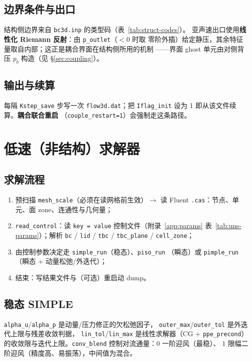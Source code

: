 \documentclass[11pt,a4paper]{ctexart}
\begin{document}
\subsection{边界条件与出口}

结构侧边界来自 \texttt{bc3d.inp} 的类型码（表~\ref{tab:struct-codes}）。
亚声速出口使用\textbf{线性化 Riemann 反射}：由 \texttt{p\_outlet}（$<0$ 时取
零阶外插）给定静压，其余特征量取自内部；这正是耦合界面在结构侧所用的机制
——界面 ghost 单元由对侧背压 $p_b$ 构造（见 \S\ref{sec:coupling}）。

\subsection{输出与续算}

每隔 \texttt{Kstep\_save} 步写一次 \texttt{flow3d.dat}；把
\texttt{Iflag\_init} 设为 1 即从该文件续算。\textbf{耦合联合重启}
（\texttt{couple\_restart=1}）会强制走这条路径。

\section{低速（非结构）求解器}\label{sec:uns}

\subsection{求解流程}

\begin{enumerate}\itemsep2pt
  \item 预扫描 \texttt{mesh\_scale}（必须在读网格前生效）$\to$ 读 Fluent
        \texttt{.cas}：节点、单元、面 zone、连通性与几何量；
  \item \texttt{read\_control}：读 \texttt{key = value} 控制文件（附录~\ref{app:params}
        表~\ref{tab:uns-params}）；解析 \texttt{bc} / \texttt{lid} / \texttt{tbc} /
        \texttt{tbc\_plane} / \texttt{cell\_zone}；
  \item 由控制参数决定走 \texttt{simple\_run}（稳态）、\texttt{piso\_run}
        （瞬态）或 \texttt{pimple\_run}（瞬态 + 动量松弛/外迭代）；
  \item 结束：写结果文件与（可选）重启动 dump。
\end{enumerate}

\subsection{稳态 SIMPLE}

\texttt{alpha\_u}/\texttt{alpha\_p} 是动量/压力修正的欠松弛因子，
\texttt{outer\_max}/\texttt{outer\_tol} 是外迭代上限与残差收敛判据，
\texttt{lin\_tol}/\texttt{lin\_max} 是线性求解器（CG + \texttt{ppe\_precond}）
的收敛限与迭代上限。\texttt{conv\_blend} 控制对流通量：0 一阶迎风（最稳）、
1 限幅二阶迎风（精度高、易振荡），中间值为混合。
\end{document}
